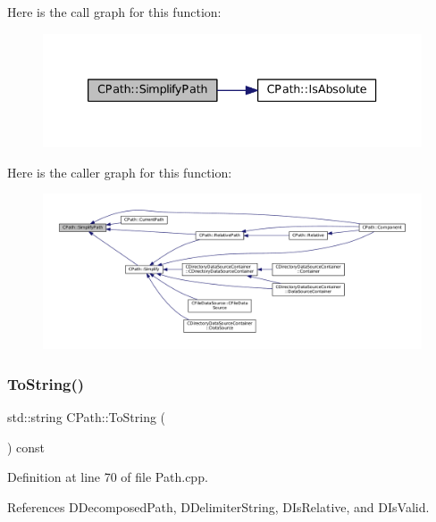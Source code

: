 Here is the call graph for this function\+:\nopagebreak
\begin{figure}[H]
\begin{center}
\leavevmode
\includegraphics[width=333pt]{classCPath_af0213a2ea0de0498ded236137e759922_cgraph}
\end{center}
\end{figure}
Here is the caller graph for this function\+:\nopagebreak
\begin{figure}[H]
\begin{center}
\leavevmode
\includegraphics[width=350pt]{classCPath_af0213a2ea0de0498ded236137e759922_icgraph}
\end{center}
\end{figure}
\hypertarget{classCPath_abbafaf377a7e38e0151bd9567d526951}{}\label{classCPath_abbafaf377a7e38e0151bd9567d526951} 
\subsubsection{\texorpdfstring{To\+String()}{ToString()}}
{\footnotesize\ttfamily std\+::string C\+Path\+::\+To\+String (\begin{DoxyParamCaption}{ }\end{DoxyParamCaption}) const}



Definition at line 70 of file Path.\+cpp.



References D\+Decomposed\+Path, D\+Delimiter\+String, D\+Is\+Relative, and D\+Is\+Valid.



